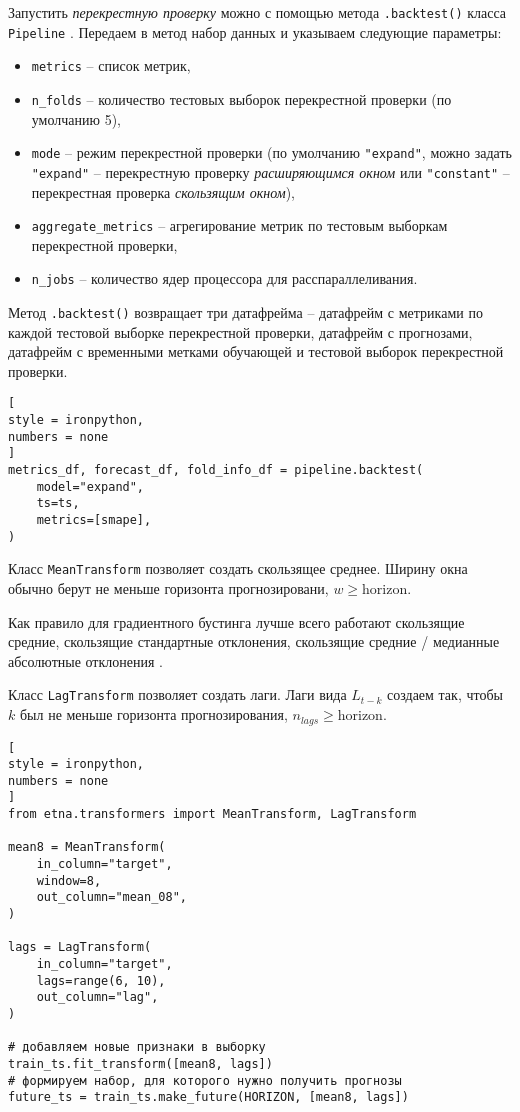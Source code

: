 \documentclass[%
	11pt,
	a4paper,
	utf8,
		]{article}
\begin{document}
Запустить \emph{перекрестную проверку} можно с помощью метода \verb|.backtest()| класса \verb|Pipeline| \cite[]{gruzdev:time-series-2022}. Передаем в метод набор данных и указываем следующие параметры:
\begin{itemize}
	\item \verb|metrics| -- список метрик,
	
	\item \verb|n_folds| -- количество тестовых выборок перекрестной проверки (по умолчанию 5),
	
	\item \verb|mode| -- режим перекрестной проверки (по умолчанию \verb|"expand"|, можно задать \verb|"expand"| -- перекрестную проверку \emph{расширяющимся окном} или \verb|"constant"| -- перекрестная проверка \emph{скользящим окном}),
	
	\item \verb|aggregate_metrics| -- агрегирование метрик по тестовым выборкам перекрестной проверки,
	
	\item \verb|n_jobs| -- количество ядер процессора для расспараллеливания.
\end{itemize}

Метод \verb|.backtest()| возвращает три датафрейма -- датафрейм с метриками по каждой тестовой выборке перекрестной проверки, датафрейм с прогнозами, датафрейм с временными метками обучающей и тестовой выборок перекрестной проверки.
\begin{lstlisting}[
style = ironpython,
numbers = none
]
metrics_df, forecast_df, fold_info_df = pipeline.backtest(
    model="expand",
    ts=ts, 
    metrics=[smape],
)
\end{lstlisting}

Класс \verb|MeanTransform| позволяет создать скользящее среднее. Ширину окна обычно берут не меньше горизонта прогнозировани, $w \geqslant \text{horizon}$.

Как правило для градиентного бустинга лучше всего работают скользящие средние, скользящие стандартные отклонения, скользящие средние / медианные абсолютные отклонения \cite[]{gruzdev:time-series-2022}.

Класс \verb|LagTransform| позволяет создать лаги. Лаги вида $L_{t -k}$ создаем так, чтобы $k$ был не меньше горизонта прогнозирования, $n_{lags} \geqslant \text{horizon}$.

\begin{lstlisting}[
style = ironpython,
numbers = none
]
from etna.transformers import MeanTransform, LagTransform

mean8 = MeanTransform(
    in_column="target",
    window=8,
    out_column="mean_08",
)

lags = LagTransform(
    in_column="target",
    lags=range(6, 10),
    out_column="lag",
)

# добавляем новые признаки в выборку
train_ts.fit_transform([mean8, lags])
# формируем набор, для которого нужно получить прогнозы
future_ts = train_ts.make_future(HORIZON, [mean8, lags])
\end{lstlisting}
\end{document}
